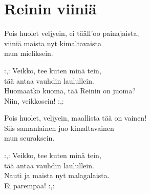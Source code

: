 \section{Reinin viiniä}

Pois huolet veljyein, ei tääll'oo painajaista,\\
viiniä maista nyt kimaltavaista\\
mun mieliksein.

:,: Veikko, tee kuten minä tein,\\
tää antaa vauhdin laulullein.\\
Huomaatko kuoma, tää Reinin on juoma?\\
Niin, veikkosein! :,:

Pois huolet, veljyein, maallista tää on vainen! \\
Siis samanlainen juo kimaltavainen\\
mun seuraksein.

:,: Veikko, tee kuten minä tein,\\
tää antaa vauhdin laulullein.\\
Nauti ja maista nyt malagalaista.\\
Ei parempaa! :,: